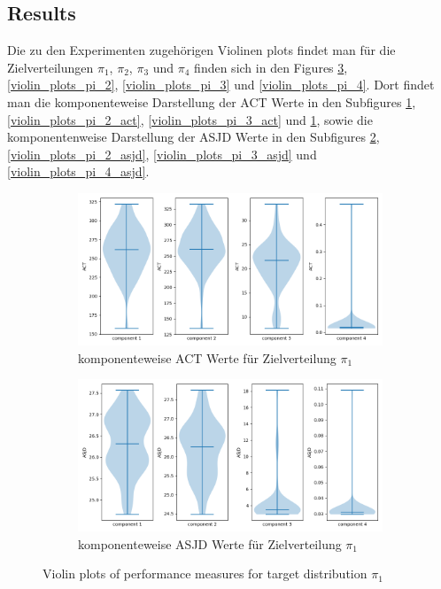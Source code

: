 \documentclass{scrartcl}
\begin{document}
    \subsection{Results}
    Die zu den Experimenten zugehörigen Violinen plots findet man für die Zielverteilungen $\pi_1$, $\pi_2$, $\pi_3$ und $\pi_4$ finden sich
    in den Figures \ref{violin_plots_pi_1}, \ref{violin_plots_pi_2}, \ref{violin_plots_pi_3} und \ref{violin_plots_pi_4}. Dort findet man
    die komponenteweise Darstellung der ACT Werte in den Subfigures \ref{violin_plots_pi_1_act}, \ref{violin_plots_pi_2_act}, \ref{violin_plots_pi_3_act} und \ref{violin_plots_pi_1_act}, sowie
    die komponentenweise Darstellung der ASJD Werte in den Subfigures \ref{violin_plots_pi_1_asjd}, \ref{violin_plots_pi_2_asjd}, \ref{violin_plots_pi_3_asjd} und \ref{violin_plots_pi_4_asjd}.

    \begin{figure}
        \centering
        \begin{subfigure}{0.45\textheight}
              \centering
              \includegraphics[width=.8\linewidth]{../figs/ACT_pi_1.png}
              \caption{komponenteweise ACT Werte für Zielverteilung $\pi_1$}
              \label{violin_plots_pi_1_act}
        \end{subfigure}
        \begin{subfigure}{0.45\textheight}
              \centering
              \includegraphics[width=.8\linewidth]{../figs/ASJD_pi_1.png}
              \caption{komponenteweise ASJD Werte für Zielverteilung $\pi_1$}
              \label{violin_plots_pi_1_asjd}
        \end{subfigure}
        \caption{Violin plots of performance measures for target distribution $\pi_1$}
        \label{violin_plots_pi_1}
    \end{figure}
\end{document}
